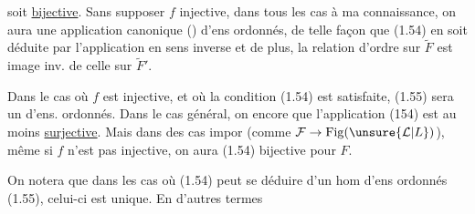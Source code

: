 \diagram{\begin{minipage}{\linewidth}
\[
\vcenter{\hbox{\begin{tikzcd}[ampersand replacement=\&,column sep=large,row sep=small]
\mathrm{Ssfig}(F') \arrow[r] \& \mathrm{Ssfig}(F^{\unsure{9|\prime|?}}) \& \text{où }F=f(F') \\
G' \arrow[r,maps to] \& f(\unsure{C|G}') \&
\end{tikzcd}}}
\tag*{\makebox[0pt][r]{\makebox[\displaywidth][l]{(1.54)}}}
\]
\end{minipage}}
soit \uline{bijective}. Sans supposer $f$ injective, dans tous les cas à ma connaissance, on aura une application canonique ()
d'ens ordonnés, de telle façon que (1.54) en soit déduite par l'application en sens inverse
et de plus, la  relation d'ordre sur $\widetilde F$ est image inv. de celle sur $\widetilde F'$.

Dans le cas où $f$ est injective, et où la condition (1.54) est satisfaite, (1.55) sera un  d'ens. ordonnés. Dans le cas général, on  encore que l'application (154) est  au moins \uline{surjective}.  Mais dans des cas impor (comme $\mathcal F\to\mathrm{Fig}(\unsure{\mathcal L|L})$), même si $f$ n'est pas injective, on aura (1.54) bijective pour  $F$.

On notera que dans les cas où (1.54) peut se déduire d'un  hom d'ens ordonnés (1.55), celui-ci est unique. En d'autres termes
